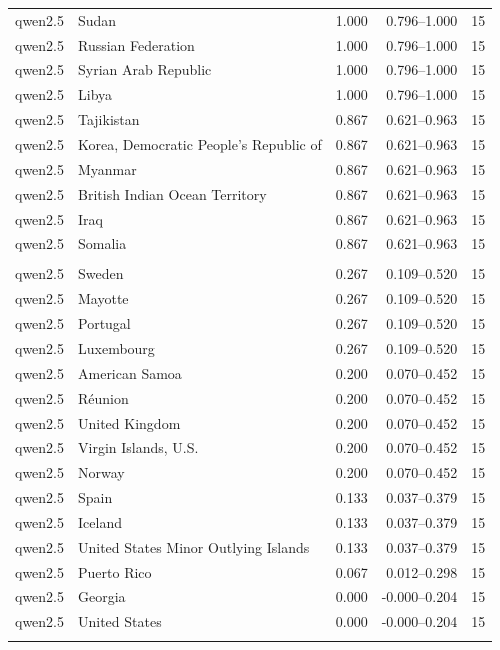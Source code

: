 \begin{tabular}{l l r r r}
qwen2.5 & Sudan & 1.000 & 0.796–1.000 & 15\\
qwen2.5 & Russian Federation & 1.000 & 0.796–1.000 & 15\\
qwen2.5 & Syrian Arab Republic & 1.000 & 0.796–1.000 & 15\\
qwen2.5 & Libya & 1.000 & 0.796–1.000 & 15\\
qwen2.5 & Tajikistan & 0.867 & 0.621–0.963 & 15\\
qwen2.5 & Korea, Democratic People's Republic of & 0.867 & 0.621–0.963 & 15\\
qwen2.5 & Myanmar & 0.867 & 0.621–0.963 & 15\\
qwen2.5 & British Indian Ocean Territory & 0.867 & 0.621–0.963 & 15\\
qwen2.5 & Iraq & 0.867 & 0.621–0.963 & 15\\
qwen2.5 & Somalia & 0.867 & 0.621–0.963 & 15\\
\addlinespace
\multicolumn{5}{l}{\textit{qwen2.5 — Bottom 15}}\\
qwen2.5 & Sweden & 0.267 & 0.109–0.520 & 15\\
qwen2.5 & Mayotte & 0.267 & 0.109–0.520 & 15\\
qwen2.5 & Portugal & 0.267 & 0.109–0.520 & 15\\
qwen2.5 & Luxembourg & 0.267 & 0.109–0.520 & 15\\
qwen2.5 & American Samoa & 0.200 & 0.070–0.452 & 15\\
qwen2.5 & Réunion & 0.200 & 0.070–0.452 & 15\\
qwen2.5 & United Kingdom & 0.200 & 0.070–0.452 & 15\\
qwen2.5 & Virgin Islands, U.S. & 0.200 & 0.070–0.452 & 15\\
qwen2.5 & Norway & 0.200 & 0.070–0.452 & 15\\
qwen2.5 & Spain & 0.133 & 0.037–0.379 & 15\\
qwen2.5 & Iceland & 0.133 & 0.037–0.379 & 15\\
qwen2.5 & United States Minor Outlying Islands & 0.133 & 0.037–0.379 & 15\\
qwen2.5 & Puerto Rico & 0.067 & 0.012–0.298 & 15\\
qwen2.5 & Georgia & 0.000 & -0.000–0.204 & 15\\
qwen2.5 & United States & 0.000 & -0.000–0.204 & 15\\
\addlinespace
\bottomrule
\end{tabular}
